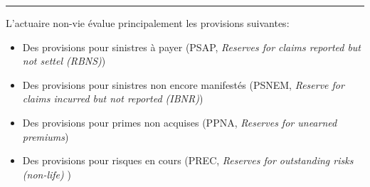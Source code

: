 \hrule

\begin{f}[Provision]
	
L'actuaire non-vie évalue principalement les 
provisions suivantes:
\begin{itemize}
	\item Des provisions pour sinistres à payer (PSAP, \emph{Reserves for claims reported but not settel (RBNS)}) 
	\item Des provisions pour sinistres non encore manifestés (PSNEM, \emph{Reserve for claims incurred but not reported (IBNR)})
	\item Des provisions pour primes non acquises (PPNA, \emph{Reserves for unearned premiums})
	\item Des provisions pour risques en cours (PREC,  \emph{Reserves for outstanding risks (non-life)}
	)
\end{itemize}

\end{f}




